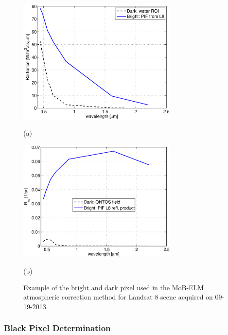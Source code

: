 \documentclass[onecolumn,3p,letterpaper]{elsarticle}
\begin{document}
\begin{figure}[htb]
  \begin{minipage}[c]{0.48\linewidth}
    \centering
      \includegraphics[width=8cm]{./Images/ELMrad130929_150422}
    \centerline{(a)}\medskip
  \end{minipage}
  \hfill
  \begin{minipage}[d]{0.48\linewidth}
    \centering
      \includegraphics[width=8cm]{./Images/ELMRrs130929_150422}
    \centerline{(b)}\medskip
  \end{minipage}
  \caption{Example of the bright and dark pixel used in the MoB-ELM atmospheric correction method for Landsat 8 scene acquired on 09-19-2013.\label{fig:MOBELMpxls} } 
\end{figure}

\subsubsection{Black Pixel Determination}
\label{subsubsec:blackpixel}
\end{document}
